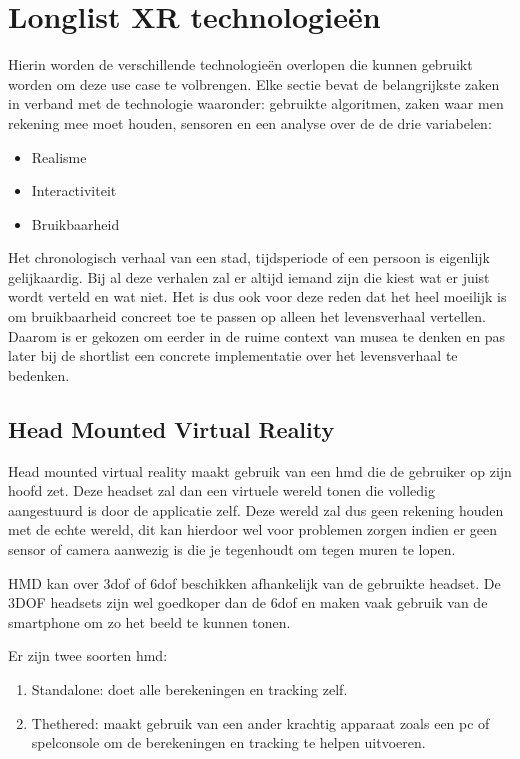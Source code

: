 \chapter{Longlist XR technologieën}
\label{ch:longlist}

Hierin worden de verschillende technologieën overlopen die kunnen gebruikt worden om deze use case te volbrengen.
Elke sectie bevat de belangrijkste zaken in verband met de technologie waaronder: gebruikte algoritmen, zaken waar men rekening mee moet houden, sensoren en een analyse over de de drie variabelen:

\begin{itemize}
    \item Realisme
    \item Interactiviteit
    \item Bruikbaarheid
\end{itemize}

Het chronologisch verhaal van een stad, tijdsperiode of een persoon is eigenlijk gelijkaardig. Bij al deze verhalen zal er altijd iemand zijn die kiest wat er juist wordt verteld en wat niet. Het is dus ook voor deze reden dat het heel moeilijk is om bruikbaarheid concreet toe te passen op alleen het levensverhaal vertellen. Daarom is er gekozen om eerder in de ruime context van musea te denken en pas later bij de shortlist een concrete implementatie over het levensverhaal te bedenken. 

\section{Head Mounted Virtual Reality}
Head mounted virtual reality maakt gebruik van een \acrshort{hmd} die de gebruiker op zijn hoofd zet. Deze headset zal dan een virtuele wereld tonen die volledig aangestuurd is door de applicatie zelf. Deze wereld zal dus geen rekening houden met de echte wereld, dit kan hierdoor wel voor problemen zorgen indien er geen sensor of camera aanwezig is die je tegenhoudt om tegen muren te lopen.

HMD kan over \acrshort{3dof} of \acrshort{6dof} beschikken afhankelijk van de gebruikte headset. De 3DOF headsets zijn wel goedkoper dan de \acrshort{6dof} en maken vaak gebruik van de smartphone om zo het beeld te kunnen tonen. 

Er zijn twee soorten \acrshort{hmd}:
\begin{enumerate}
    \item Standalone: doet alle berekeningen en tracking zelf.
    \item Thethered: maakt gebruik van een ander krachtig apparaat zoals een pc of spelconsole om de berekeningen en tracking te helpen uitvoeren.
\end{enumerate}
